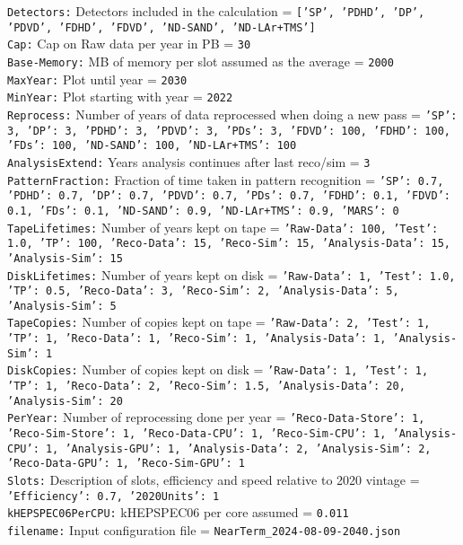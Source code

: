 {\tt Detectors:} Detectors included in the calculation = {\tt ['SP', 'PDHD', 'DP', 'PDVD', 'FDHD', 'FDVD', 'ND-SAND', 'ND-LAr+TMS']} \\
{\tt Cap:} Cap on Raw data per year in PB = {\tt 30} \\
{\tt Base-Memory:} MB of memory per slot assumed as the average = {\tt 2000} \\
{\tt MaxYear:} Plot until year = {\tt 2030} \\
{\tt MinYear:} Plot starting with year = {\tt 2022} \\
{\tt Reprocess:} Number of years of data reprocessed when doing a new pass = {\tt {'SP': 3, 'DP': 3, 'PDHD': 3, 'PDVD': 3, 'PDs': 3, 'FDVD': 100, 'FDHD': 100, 'FDs': 100, 'ND-SAND': 100, 'ND-LAr+TMS': 100}} \\
{\tt AnalysisExtend:} Years analysis continues after last reco/sim = {\tt 3} \\
{\tt PatternFraction:} Fraction of time taken in pattern recognition = {\tt {'SP': 0.7, 'PDHD': 0.7, 'DP': 0.7, 'PDVD': 0.7, 'PDs': 0.7, 'FDHD': 0.1, 'FDVD': 0.1, 'FDs': 0.1, 'ND-SAND': 0.9, 'ND-LAr+TMS': 0.9, 'MARS': 0}} \\
{\tt TapeLifetimes:} Number of years kept on tape = {\tt {'Raw-Data': 100, 'Test': 1.0, 'TP': 100, 'Reco-Data': 15, 'Reco-Sim': 15, 'Analysis-Data': 15, 'Analysis-Sim': 15}} \\
{\tt DiskLifetimes:} Number of years kept on disk = {\tt {'Raw-Data': 1, 'Test': 1.0, 'TP': 0.5, 'Reco-Data': 3, 'Reco-Sim': 2, 'Analysis-Data': 5, 'Analysis-Sim': 5}} \\
{\tt TapeCopies:} Number of copies kept on tape = {\tt {'Raw-Data': 2, 'Test': 1, 'TP': 1, 'Reco-Data': 1, 'Reco-Sim': 1, 'Analysis-Data': 1, 'Analysis-Sim': 1}} \\
{\tt DiskCopies:} Number of copies kept on disk = {\tt {'Raw-Data': 1, 'Test': 1, 'TP': 1, 'Reco-Data': 2, 'Reco-Sim': 1.5, 'Analysis-Data': 20, 'Analysis-Sim': 20}} \\
{\tt PerYear:} Number of reprocessing done per year = {\tt {'Reco-Data-Store': 1, 'Reco-Sim-Store': 1, 'Reco-Data-CPU': 1, 'Reco-Sim-CPU': 1, 'Analysis-CPU': 1, 'Analysis-GPU': 1, 'Analysis-Data': 2, 'Analysis-Sim': 2, 'Reco-Data-GPU': 1, 'Reco-Sim-GPU': 1}} \\
{\tt Slots:} Description of slots, efficiency and speed relative to 2020 vintage = {\tt {'Efficiency': 0.7, '2020Units': 1}} \\
{\tt kHEPSPEC06PerCPU:} kHEPSPEC06 per core assumed = {\tt 0.011} \\
{\tt filename:} Input configuration file = {\tt NearTerm\_2024-08-09-2040.json} \\
